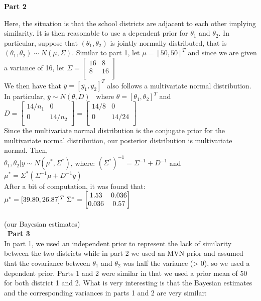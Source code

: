 \documentclass[10pt,a4paper]{article}
\begin{document}
\begin{flushleft}
\textbf{Part 2}
\end{flushleft}
Here, the situation is that the school districts are adjacent to each other implying similarity. It is then reasonable to use a dependent prior for $\theta_1$ and $\theta_2$. In particular, suppose that $(\theta_1, \theta_2)$ is jointly normally distributed, that is $(\theta_1, \theta_2) \sim N(\mu, \Sigma)$. Similar to part 1, let $\mu = [50, 50]^T$ and since we are given a variance of 16, let
$\Sigma=\begin{bmatrix}
16 & 8\\
8  & 16\\
\end{bmatrix}$\\
We then have that $\overline{y}=[\overline{y_1},\overline{y_2}]^T$ also follows a multivariate normal distribution. In particular, $\overline{y} \sim N(\theta, D)$ \ 
where $\theta=[\theta_1,\theta_2]^T$ and $D=\begin{bmatrix}
14/n_1 & 0\\
0  & 14/n_2\\
\end{bmatrix}=\begin{bmatrix}
14/8 & 0\\
0  & 14/24\\
\end{bmatrix}$\\
Since the multivariate normal distribution is the conjugate prior for the multivariate normal distribution, our posterior distribution is multivariate normal. Then,\\
$\theta_1,\theta_2|y \sim N(\mu^*,\Sigma^*)$,
where:
$(\Sigma^*)^{-1}=\Sigma^{-1}+D^{-1}$
and
$\mu^*=\Sigma^*(\Sigma^{-1}\mu+D^{-1}\overline{y})
$\\
After a bit of computation, it was found that:\\
$\mu^*=[39.80,26.87]^T\\
\\\
\Sigma^*=\begin{bmatrix}
1.53 & 0.036\\
0.036  & 0.57\\
\end{bmatrix}$\\
\\
(our Bayesian estimates)
\\\
\textbf{Part 3}\\
In part 1, we used an independent prior to represent the lack of similarity between the two districts while in part 2 we used an MVN prior and assumed that the covariance between $\theta_1$ and $\theta_2$ was half the variance (> 0), so we used a dependent prior. Parts 1 and 2 were similar in that we used a prior mean of 50 for both district 1 and 2. What is very interesting is that the Bayesian estimates and the corresponding variances in parts 1 and 2 are very similar:\\
\end{document}
